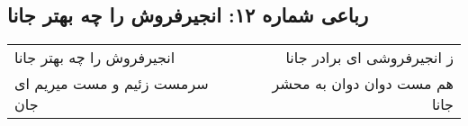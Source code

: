 \begin{center}
\section*{رباعی شماره ۱۲: انجیرفروش را چه بهتر جانا}
\label{sec:0012}
\begin{longtable}{l p{0.5cm} r}
انجیرفروش را چه بهتر جانا
&&
ز انجیرفروشی ای برادر جانا
\\
سرمست زئیم و مست میریم ای جان
&&
هم مست دوان دوان به محشر جانا
\\
\end{longtable}
\end{center}
